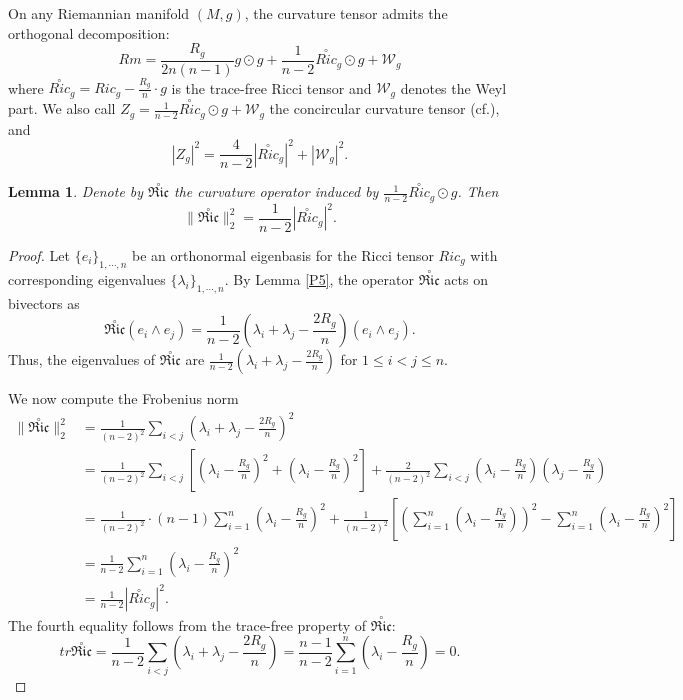 \documentclass[12pt, twoside]{article}
\newtheorem{lemma}[theorem]{Lemma}
\theoremstyle{definition}
\numberwithin{equation}{section}
\def \la {\lambda}
\begin{document}
On any Riemannian manifold $(M,g)$, the curvature tensor admits the orthogonal decomposition:
$$Rm=\frac{R_{g}}{2n(n-1)}g\odot g+\frac{1}{n-2}\overset{\circ}{Ric}_{g}\odot g+\mathcal{W}_{g}$$
where $\overset{\circ}{Ric}_{g}=Ric_{g}-\frac{R_{g}}{n}\cdot g$ is the trace-free Ricci tensor and $\mathcal{W}_{g}$ denotes the Weyl
part. 	We also call $Z_{g}=\frac{1}{n-2}\overset{\circ}{Ric}_{g}\odot g+\mathcal{W}_{g}$ the concircular curvature tensor (cf.\cite{HV97}), and
$$|Z_{g}|^{2}=\frac{4}{n-2}|\overset{\circ}{Ric}_{g}|^{2}+|\mathcal{W}_{g}|^{2}.$$
\begin{lemma}
Denote by $\overset{\circ}{\mathfrak{Ric}}$ the curvature operator induced by $\frac{1}{n-2}\overset{\circ}{Ric}_g \odot g$. Then
$$\|\overset{\circ}{\mathfrak{Ric}}\|^{2}_{2}=\frac{1}{n-2}|\overset{\circ}{Ric}_{g}|^{2}.$$
\end{lemma}
\begin{proof}
Let $\{e_{i}\}_{1,\cdots,n}$ be an orthonormal eigenbasis for the Ricci tensor $Ric_g$ with corresponding eigenvalues $\{\la_{i}\}_{1,\cdots,n}$. By Lemma \ref{P5}, the operator $\overset{\circ}{\mathfrak{Ric}}$ acts on bivectors as
$$\overset{\circ}{\mathfrak{Ric}}(e_{i}\wedge e_{j})=\frac{1}{n-2}(\la_{i}+\la_{j}-\frac{2R_{g}}{n})(e_{i}\wedge e_{j}).$$
Thus, the eigenvalues of $\overset{\circ}{\mathfrak{Ric}}$ are $\frac{1}{n-2}(\la_{i}+\la_{j}-\frac{2R_{g}}{n})$ for $1 \leq i < j \leq n$.	
	
We now compute the Frobenius norm
\begin{equation*}
\begin{split}
\|\overset{\circ}{\mathfrak{Ric}}\|_{2}^{2}&=\frac{1}{(n-2)^{2} }\sum_{i<j}\left(\la_{i}+\la_{j}-\frac{2R_{g}}{n}\right)^{2}\\
&=\frac{1}{(n-2)^{2}}\sum_{i<j}\left[\left(\la_{i}-\frac{R_{g}}{n}\right)^{2}+\left(\la_{i}-\frac{R_{g}}{n}\right)^{2}\right]+\frac{2}{(n-2)^{2} }\sum_{i<j}\left(\la_{i}-\frac{R_{g}}{n}\right)\left(\la_{j}-\frac{R_{g}}{n}\right)\\
&=\frac{1}{(n-2)^{2}}\cdot(n-1)\sum_{i=1}^n\left(\la_{i}-\frac{R_{g}}{n} \right)^{2}+\frac{1}{(n-2)^{2}}\left[\left(\sum_{i=1}^{n}(\la_{i}-\frac{R_{g}}{n})\right)^2-\sum_{i=1}^{n}\left(\la_{i}-\frac{R_{g}}{n}\right)^2\right]\\
&=\frac{1}{n-2}\sum_{i=1}^{n}\left(\la_{i}-\frac{R_{g}}{n} \right)^{2}\\
&=\frac{1}{n-2}|\overset{\circ}{Ric}_{g}|^{2}.
\end{split}
\end{equation*}
The fourth equality follows from the trace-free property of  $\overset{\circ}{\mathfrak{Ric}}$:
$$tr\overset{\circ}{\mathfrak{Ric}}=\frac{1}{n-2}\sum_{i<j}(\la_{i}+\la_{j}-\frac{2R_{g}}{n})=\frac{n-1}{n-2}\sum_{i=1}^{n}(\la_{i}-\frac{R_{g}}{n})=0.$$	
\end{proof}
\end{document}
